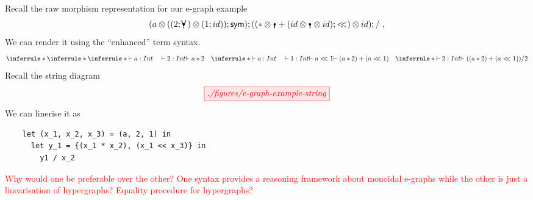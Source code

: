 \documentclass[acmsmall,screen, nonacm, anonymous]{acmart}
\begin{document}
\begin{example}
  Recall the raw morphism representation for our e-graph example
  \[(a \otimes ((2;\comonoid) \otimes (1;id));\sym);((* \otimes \counit + (id \otimes \counit \otimes id);<\!\!<) \otimes id);/~,\]
  We can render it using the  \enquote{enhanced} term syntax.
  \[
  \inferrule*{
  \inferrule*{
  \inferrule*{\vdash a : Int \quad \vdash 2 : Int}{\vdash a * 2}
  \quad
  \inferrule*{\vdash a : Int \quad \vdash 1 : Int}{\vdash a <\!\!< 1}
  }{\vdash (a * 2) + (a <\!\!< 1)}
  \quad
  \inferrule*{}{\vdash 2 : Int}
  }
  {\vdash ((a * 2) + (a <\!\!< 1)) / 2}
  \]
  Recall the string diagram
  \[
  \tikzfig{./figures/e-graph-example-string}
  \]
  We can linerise it as
  \begin{verbatim}
    let (x_1, x_2, x_3) = (a, 2, 1) in
      let y_1 = {(x_1 * x_2), (x_1 << x_3)} in
        y1 / x_2
  \end{verbatim}
  \textcolor{red}{Why would one be preferable over the other? One syntax provides a reasoning framework about monoidal e-graphs while the other is just a linearisation of hypergraphs? Equality procedure for hypergraphs?}
\end{example}



\end{document}
